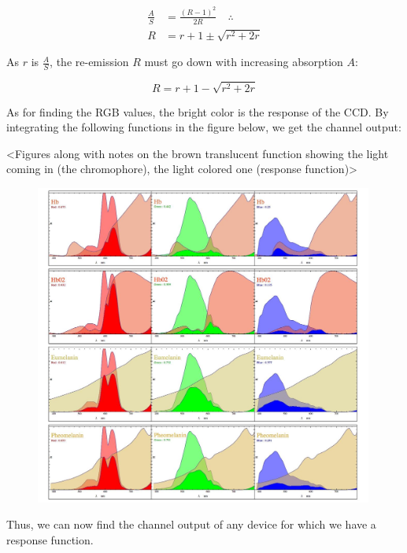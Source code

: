 \begin{align}\label{eq:KubelkaMunk2}
\frac{A}{S} &=\frac{(R-1)^2}{2 R} \quad \therefore\\
R &= r+1 \pm \sqrt{r^2+2 r}
\end{align}

As $r$ is $\frac{A}{S}$, the re-emission $R$ must go down with increasing absorption $A$:

\begin{equation}\label{eq:KubelkaMunk3}
R = r+1 - \sqrt{r^2+2 r}
\end{equation}

As for finding the RGB values, the bright color is the response of the CCD. By integrating the following functions in the figure below, we get the channel output:

<Figures along with notes on the brown translucent function showing the light coming in (the chromophore), the light colored one (response function)>

\begin{figure}[h!]
  \centering
    \includegraphics[width=0.99\textwidth]{Chapter1/Figs/Chromophores_NokiaN900.jpg}
    \caption{}  \label{fig:Chromophores_NokiaN900}
\end{figure}



Thus, we can now find the channel output of any device for which we have a response function.

